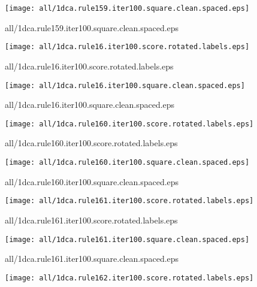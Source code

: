 \documentclass{article}
\begin{document}
\begin{center}
\begin{minipage}{\textwidth}
\texttt{[image: all/1dca.rule159.iter100.square.clean.spaced.eps]}
\end{minipage}
\end{center}
{\footnotesize all/1dca.rule159.iter100.square.clean.spaced.eps}
\begin{center}
\begin{minipage}{\textwidth}
\texttt{[image: all/1dca.rule16.iter100.score.rotated.labels.eps]}
\end{minipage}
\end{center}
{\footnotesize all/1dca.rule16.iter100.score.rotated.labels.eps}
\begin{center}
\begin{minipage}{\textwidth}
\texttt{[image: all/1dca.rule16.iter100.square.clean.spaced.eps]}
\end{minipage}
\end{center}
{\footnotesize all/1dca.rule16.iter100.square.clean.spaced.eps}
\begin{center}
\begin{minipage}{\textwidth}
\texttt{[image: all/1dca.rule160.iter100.score.rotated.labels.eps]}
\end{minipage}
\end{center}
{\footnotesize all/1dca.rule160.iter100.score.rotated.labels.eps}
\begin{center}
\begin{minipage}{\textwidth}
\texttt{[image: all/1dca.rule160.iter100.square.clean.spaced.eps]}
\end{minipage}
\end{center}
{\footnotesize all/1dca.rule160.iter100.square.clean.spaced.eps}
\begin{center}
\begin{minipage}{\textwidth}
\texttt{[image: all/1dca.rule161.iter100.score.rotated.labels.eps]}
\end{minipage}
\end{center}
{\footnotesize all/1dca.rule161.iter100.score.rotated.labels.eps}
\begin{center}
\begin{minipage}{\textwidth}
\texttt{[image: all/1dca.rule161.iter100.square.clean.spaced.eps]}
\end{minipage}
\end{center}
{\footnotesize all/1dca.rule161.iter100.square.clean.spaced.eps}
\begin{center}
\begin{minipage}{\textwidth}
\texttt{[image: all/1dca.rule162.iter100.score.rotated.labels.eps]}
\end{minipage}
\end{center}
\end{document}
